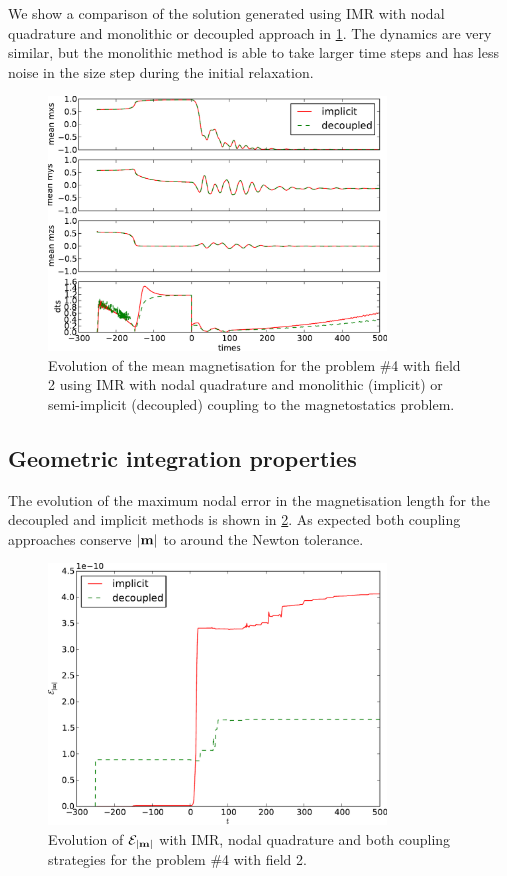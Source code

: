 We show a comparison of the solution generated using IMR with nodal quadrature and monolithic or decoupled approach in \cref{fig:mumag4-implicit-decoupled}.
The dynamics are very similar, but the monolithic method is able to take larger time steps and has less noise in the size step during the initial relaxation.
\begin{figure}
  \centering
  \includegraphics[width=0.8\textwidth]
  {plots/monolithic_vs_decoupled/meanmxsvs-meanmysvs-meanmzsvs-dtsvstimes.pdf}
  \caption{
    Evolution of the mean magnetisation for the \mumag problem \#4 with field 2 using IMR with nodal quadrature and monolithic (implicit) or semi-implicit (decoupled) coupling to the magnetostatics problem.
  }
  \label{fig:mumag4-implicit-decoupled}
\end{figure}

\subsection{Geometric integration properties}

The evolution of the maximum nodal error in the magnetisation length for the decoupled and implicit methods is shown in \cref{fig:imr-conservation}.
As expected both coupling approaches conserve $\left|{\boldsymbol{\mathrm{m}}} \right|$ to around the Newton tolerance.
\begin{figure}
  \centering
  \includegraphics[width=0.8\textwidth]{plots/mumag4_ml/mlengtherrormaxesvstimes.pdf}
  \caption{
    Evolution of $\mathcal{E}_{\left|{\boldsymbol{\mathrm{m}}} \right|}$
    with IMR, nodal quadrature and both coupling strategies
    for the \mumag problem \#4 with field 2.
  }
  \label{fig:imr-conservation}
\end{figure}



